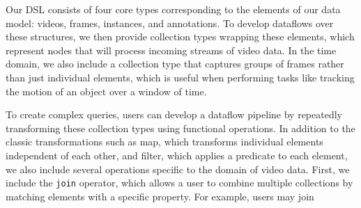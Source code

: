 Our DSL consists of four core types corresponding to the elements of our data model: videos, frames, instances, and annotations. To develop dataflows over these structures, we then provide collection types wrapping these elements, which represent nodes that will process incoming streams of video data. In the time domain, we also include a collection type that captures groups of frames rather than just individual elements, which is useful when performing tasks like tracking the motion of an object over a window of time.

To create complex queries, users can develop a dataflow pipeline by repeatedly transforming these collection types using functional operations. In addition to the classic transformations such as map, which transforms individual elements independent of each other, and filter, which applies a predicate to each element, we also include several operations specific to the domain of video data. First, we include the \texttt{join} operator, which allows a user to combine multiple collections by matching elements with a specific property. For example, users may join 





